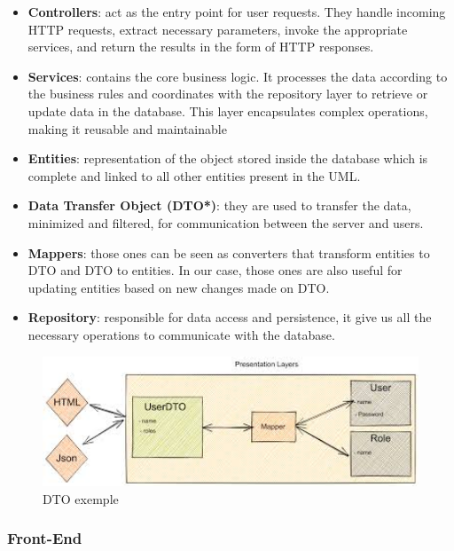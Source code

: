 \documentclass[12pt,a4paper,table,english]{article}
\begin{document}
	\begin{itemize}
		\item \textbf{Controllers}: act as the entry point for user requests. They handle incoming HTTP requests, extract necessary parameters, invoke the appropriate services, and return the results in the form of HTTP responses.

		
		\item \textbf{Services}: contains the core business logic. It processes the data according to the business rules and coordinates with the repository layer to retrieve or update data in the database. This layer encapsulates complex operations, making it reusable and maintainable
		
		 
		\item \textbf{Entities}: representation of the object stored inside the database which is complete and linked to all other entities present in the UML.
		
		\item \textbf{Data Transfer Object (DTO*)}: they are used to transfer the data, minimized and filtered, for communication between the server and users.
		 
		\item \textbf{Mappers}: those ones can be seen as converters that transform entities to DTO and DTO to entities. In our case, those ones are also useful for updating entities based on new changes made on DTO.
		
		\item \textbf{Repository}: responsible for data access and persistence, it give us all the necessary operations to communicate with the database.
		
	\end{itemize}

	\begin{figure}[H]
		\centering
		\includegraphics[width=150mm]{Image/dto}
		\caption{DTO exemple}
		\label{fig:DTO exemple}
	\end{figure}	
	
	\newpage
	\subsubsection{Front-End}
		
\end{document}
